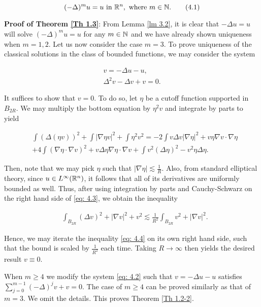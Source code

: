 \documentclass{article}
\begin{document}
\begin{equation}
    (-\Delta)^m u = u \textrm{ in } \mathbb{R}^n, \textrm{ where } m \in \mathbb{N}. 
     \tag{4.1} \label{eq: 4.1}
\end{equation}


\noindent
\textbf{Proof of Theorem \ref{Th 1.3}}: From Lemma \ref{lm 3.2}, it is clear that $-\Delta u = u$ will solve $(-\Delta)^m u = u$ for any $m \in \mathbb{N}$ and we have already shown uniqueness when $m=1,2$. Let us now consider the case $m=3$. To prove uniqueness of the classical solutions in the class of bounded functions, we may consider the system

\begin{align*}
    v= -\Delta u - u,\\
    \Delta^2 v - \Delta v + v=0.
    \tag{4.2} \label{eq: 4.2}
\end{align*}

It suffices to show that $v=0$. To do so, let $\eta$ be a cutoff function supported in $B_{2R}$. We may multiply the bottom equation by $\eta^2 v$ and integrate by parts to yield

\begin{align*}
    &\int (\Delta (\eta v))^2 + \int |\nabla \eta v|^2 + \int \eta^2 v^2 = -2 \int v \Delta v |\nabla \eta|^2 + v\eta \nabla v \cdot \nabla \eta  \\ 
    & + 4\int (\nabla \eta \cdot \nabla v)^2 + v\Delta \eta \nabla \eta \cdot \nabla v + \int v^2(\Delta \eta)^2 - v^2 \eta \Delta \eta.
    \tag{4.3} \label{eq: 4.3}
\end{align*}

Then, note that we may pick $\eta$ such that $|\nabla \eta| \lesssim \frac{1}{R}$. Also, from standard elliptical theory, since $u \in L^\infty(\mathbb{R}^n)$, it follows that all of its derivatives are uniformly bounded as well. Thus, after using integration by parts and Cauchy-Schwarz on the right hand side of \eqref{eq: 4.3}, we obtain the inequality

\begin{align*}
    &\int_{B_{2R}} (\Delta v)^2 +|\nabla v|^2 + v^2  \lesssim \frac{1}{R^2} \int_{B_{2R}}v^2 + |\nabla v|^2.
    \tag{4.4}\label{eq: 4.4}
\end{align*}

Hence, we may iterate the inequality \eqref{eq: 4.4} on its own right hand side, such that the bound is scaled by $\frac{1}{R^2}$ each time. Taking $R \to \infty$ then yields the desired result $v \equiv 0$.

When $m\geq 4$ we modify the system \eqref{eq: 4.2} such that $ v= -\Delta u- u$ satisfies $ \sum_{j=0}^{m-1} (-\Delta)^j v + v=0$. The case of $m\geq 4$ can be proved similarly as that of $m=3$. We omit the details. This proves Theorem \ref{Th 1.2-2}.
\end{document}
